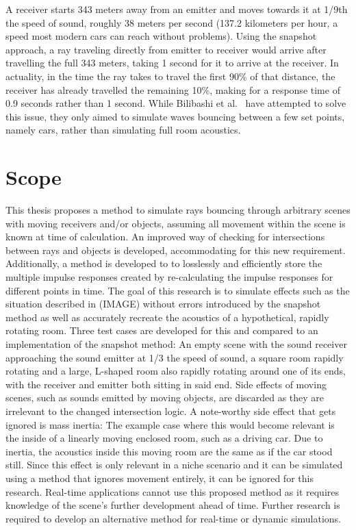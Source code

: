 A receiver starts 343 meters away from an emitter and moves towards it at 1/9th the speed of sound, roughly 38 meters per second
(137.2 kilometers per hour, a speed most modern cars can reach without problems).
Using the snapshot approach, a ray traveling directly from emitter to receiver would arrive after travelling the full 343 meters,
taking 1 second for it to arrive at the receiver.
In actuality, in the time the ray takes to travel the first 90\% of that distance,
the receiver has already travelled the remaining 10\%, making for a response time of 0.9 seconds rather than 1 second.
\newline
While Bilibashi et al.~\cite{BVD20} have attempted to solve this issue,
they only aimed to simulate waves bouncing between a few set points, namely cars,
rather than simulating full room acoustics.

\section{Scope}

This thesis proposes a method to simulate rays bouncing through arbitrary scenes with moving receivers and/or objects,
assuming all movement within the scene is known at time of calculation.
An improved way of checking for intersections between rays and objects is developed, accommodating for this new requirement.
Additionally, a method is developed to to losslessly and efficiently store the multiple impulse responses created by re-calculating
the impulse responses for different points in time.
The goal of this research is to simulate effects such as the situation described in (IMAGE) without errors introduced by the snapshot method
as well as accurately recreate the acoustics of a hypothetical, rapidly rotating room.
Three test cases are developed for this and compared to an implementation of the snapshot method: 
An empty scene with the sound receiver approaching the sound emitter at 1/3 the speed of sound,
a square room rapidly rotating
and a large, L-shaped room also rapidly rotating around one of its ends, with the receiver and emitter both sitting in said end.
\newline
Side effects of moving scenes, such as sounds emitted by moving objects, are discarded as they are irrelevant to
the changed intersection logic.
A note-worthy side effect that gets ignored is mass inertia:
The example case where this would become relevant is the inside of a linearly moving enclosed room, such as a driving car.
Due to inertia, the acoustics inside this moving room are the same as if the car stood still.
Since this effect is only relevant in a niche scenario and it can be simulated using a method that ignores movement entirely,
it can be ignored for this research.
\newline
Real-time applications cannot use this proposed method as it requires knowledge of the scene's further development ahead of time.
Further research is required to develop an alternative method for real-time or dynamic simulations.
